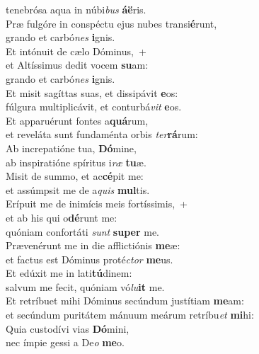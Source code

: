 \oddverse tenebrósa aqua in núbi\textit{bus} \textbf{á}\textbf{ë}ris.\\
\evenverse Præ fulgóre in conspéctu ejus nubes transi\textbf{é}runt,~\*\\
\evenverse grando et carbó\textit{nes} \textbf{i}gnis.\\
\oddverse Et intónuit de cælo Dóminus,~+\\
\oddverse  et Altíssimus dedit vocem \textbf{su}am:~\*\\
\oddverse grando et carbó\textit{nes} \textbf{i}gnis.\\
\evenverse Et misit sagíttas suas, et dissipávit \textbf{e}os:~\*\\
\evenverse fúlgura multiplicávit, et conturbá\textit{vit} \textbf{e}os.\\
\oddverse Et apparuérunt fontes a\textbf{quá}rum,~\*\\
\oddverse et reveláta sunt fundaménta orbis \textit{ter}\textbf{rá}rum:\\
\evenverse Ab increpatióne tua, \textbf{Dó}mine,~\*\\
\evenverse ab inspiratióne spíritus i\textit{ræ} \textbf{tu}æ.\\
\oddverse Misit de summo, et ac\textbf{cé}pit me:~\*\\
\oddverse et assúmpsit me de a\textit{quis} \textbf{mul}tis.\\
\evenverse Erípuit me de inimícis meis fortíssimis,~+\\
\evenverse  et ab his qui o\textbf{dé}runt me:~\*\\
\evenverse quóniam confortáti \textit{sunt} \textbf{su}\textbf{per} me.\\
\oddverse Prævenérunt me in die afflictiónis \textbf{me}æ:~\*\\
\oddverse et factus est Dóminus proté\textit{ctor} \textbf{me}us.\\
\evenverse Et edúxit me in lati\textbf{tú}dinem:~\*\\
\evenverse salvum me fecit, quóniam vó\textit{lu}\textbf{it} me.\\
\oddverse Et retríbuet mihi Dóminus secúndum justítiam \textbf{me}am:~\*\\
\oddverse et secúndum puritátem mánuum meárum retríbu\textit{et} \textbf{mi}hi:\\
\evenverse Quia custodívi vias \textbf{Dó}mini,~\*\\
\evenverse nec ímpie gessi a De\textit{o} \textbf{me}o.\\
